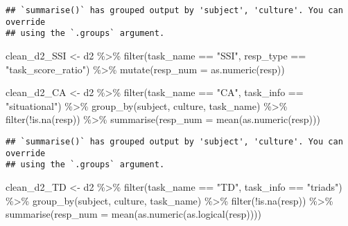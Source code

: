 \documentclass[
]{article}
\newenvironment{Shaded}{\begin{snugshade}}{\end{snugshade}}
\newcommand{\AttributeTok}[1]{\textcolor[rgb]{0.77,0.63,0.00}{#1}}
\newcommand{\FunctionTok}[1]{\textcolor[rgb]{0.00,0.00,0.00}{#1}}
\newcommand{\NormalTok}[1]{#1}
\newcommand{\OtherTok}[1]{\textcolor[rgb]{0.56,0.35,0.01}{#1}}
\newcommand{\SpecialCharTok}[1]{\textcolor[rgb]{0.00,0.00,0.00}{#1}}
\newcommand{\StringTok}[1]{\textcolor[rgb]{0.31,0.60,0.02}{#1}}
\begin{document}
\begin{verbatim}
## `summarise()` has grouped output by 'subject', 'culture'. You can override
## using the `.groups` argument.
\end{verbatim}

\begin{Shaded}
\begin{Highlighting}[]
\NormalTok{clean\_d2\_SSI }\OtherTok{\textless{}{-}}\NormalTok{ d2 }\SpecialCharTok{\%\textgreater{}\%} 
  \FunctionTok{filter}\NormalTok{(task\_name }\SpecialCharTok{==} \StringTok{"SSI"}\NormalTok{, resp\_type }\SpecialCharTok{==} \StringTok{"task\_score\_ratio"}\NormalTok{) }\SpecialCharTok{\%\textgreater{}\%}
  \FunctionTok{mutate}\NormalTok{(}\AttributeTok{resp\_num =} \FunctionTok{as.numeric}\NormalTok{(resp))}

\NormalTok{clean\_d2\_CA }\OtherTok{\textless{}{-}}\NormalTok{ d2 }\SpecialCharTok{\%\textgreater{}\%} 
  \FunctionTok{filter}\NormalTok{(task\_name }\SpecialCharTok{==} \StringTok{"CA"}\NormalTok{, task\_info }\SpecialCharTok{==} \StringTok{"situational"}\NormalTok{) }\SpecialCharTok{\%\textgreater{}\%} 
  \FunctionTok{group\_by}\NormalTok{(subject, culture, task\_name) }\SpecialCharTok{\%\textgreater{}\%} 
  \FunctionTok{filter}\NormalTok{(}\SpecialCharTok{!}\FunctionTok{is.na}\NormalTok{(resp)) }\SpecialCharTok{\%\textgreater{}\%} 
  \FunctionTok{summarise}\NormalTok{(}\AttributeTok{resp\_num =} \FunctionTok{mean}\NormalTok{(}\FunctionTok{as.numeric}\NormalTok{(resp)))}
\end{Highlighting}
\end{Shaded}

\begin{verbatim}
## `summarise()` has grouped output by 'subject', 'culture'. You can override
## using the `.groups` argument.
\end{verbatim}

\begin{Shaded}
\begin{Highlighting}[]
\NormalTok{clean\_d2\_TD }\OtherTok{\textless{}{-}}\NormalTok{ d2 }\SpecialCharTok{\%\textgreater{}\%} 
  \FunctionTok{filter}\NormalTok{(task\_name }\SpecialCharTok{==} \StringTok{"TD"}\NormalTok{, task\_info }\SpecialCharTok{==} \StringTok{"triads"}\NormalTok{) }\SpecialCharTok{\%\textgreater{}\%} 
  \FunctionTok{group\_by}\NormalTok{(subject, culture, task\_name) }\SpecialCharTok{\%\textgreater{}\%} 
  \FunctionTok{filter}\NormalTok{(}\SpecialCharTok{!}\FunctionTok{is.na}\NormalTok{(resp)) }\SpecialCharTok{\%\textgreater{}\%} 
  \FunctionTok{summarise}\NormalTok{(}\AttributeTok{resp\_num =} \FunctionTok{mean}\NormalTok{(}\FunctionTok{as.numeric}\NormalTok{(}\FunctionTok{as.logical}\NormalTok{(resp))))}
\end{Highlighting}
\end{Shaded}
\end{document}
